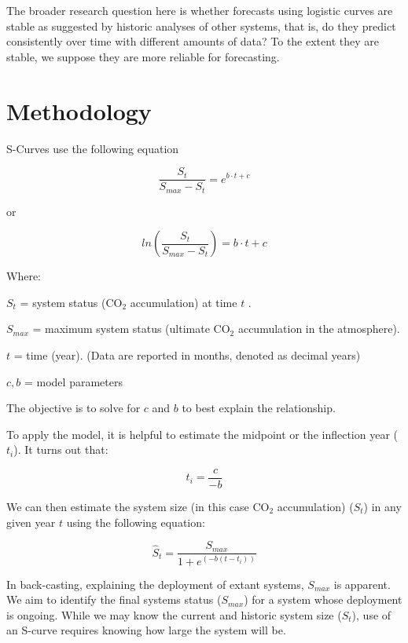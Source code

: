 \documentclass{article}
\begin{document}
The broader research question here is whether forecasts using logistic curves are stable as suggested by historic analyses of other systems, that is, do they predict consistently over time with different amounts of data? To the extent they are stable, we suppose they are more reliable for forecasting. 

\section{Methodology}

S-Curves use the following equation


\begin{equation}
\frac{S_t}{{S_{max}-S_t}} = e^{b\cdot t + c}
\end{equation}

or 

\begin{equation}
ln \left(\frac{S_t}{{S_{max}-S_t}}\right) = b \cdot  t + c
\end{equation}


Where:

$S_t$ = system status ($\mathrm{CO_{2}}$ accumulation) at time $t$ .

$S_{max}$ = maximum system status (ultimate $\mathrm{CO_{2}}$ accumulation in the atmosphere). 

$t$ = time (year). (Data are reported in months, denoted as decimal years)

$c, b$ = model parameters

The objective is to solve for $c$ and $b$ to best explain the relationship.

To apply the model, it is helpful to estimate the midpoint or the inflection year ($t_{i}$). It turns out that:

\begin{equation}
t_{i}=\frac{c}{{-b}}
\end{equation}

We can then estimate the system size (in this case $\mathrm{CO_{2}}$ accumulation) ($S_t$) in any given year $t$ using the following equation:

\begin{equation}
\widehat S_t = \frac{S_{max}}{{1 + e^{( { - b( {t - t_{i}} )} )} }}
\end{equation}

In back-casting, explaining the deployment of extant systems, $S_{max}$ is apparent. We aim to identify the final systems status ($S_{max}$) for a system whose deployment is ongoing. While we may know the current and historic system size ($S_t$), use of an S-curve requires knowing how large the system will be. 
\end{document}
